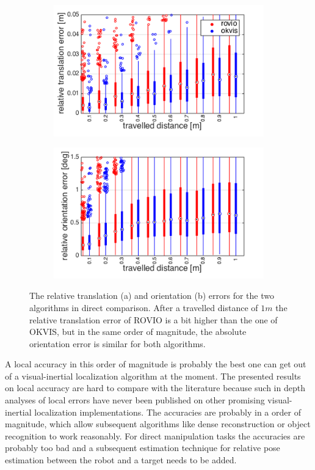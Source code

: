 \begin{figure}[h]
  \begin{subfigure}[b]{0.48\textwidth}
    \includegraphics[width=\textwidth]{images/ijrr/rte.png}
    \caption{}
    \label{fig:2}
  \end{subfigure}
  \hfill
  \begin{subfigure}[b]{0.48\textwidth}
    \includegraphics[width=\textwidth]{images/ijrr/roe.png}
    \caption{}
    \label{fig:2}
  \end{subfigure}
   \caption{The relative translation (a) and orientation (b) errors for the two algorithms in direct comparison. After a travelled distance of $1 m$ the relative translation error of ROVIO is a bit higher than the one of OKVIS, but in the same order of magnitude, the absolute orientation error is similar for both algorithms.}
   \label{pics:ijrr_rel}
\end{figure}

A local accuracy in this order of magnitude is probably the best one can get out of a visual-inertial localization algorithm at the moment. The presented results on local accuracy are hard to compare with the literature because such in depth analyses of local errors have never been published on other promising visual-inertial localization implementations. The accuracies are probably in a order of magnitude, which allow subsequent algorithms like dense reconstruction or object recognition to work reasonably. For direct manipulation tasks the accuracies are probably too bad and a subsequent estimation technique for relative pose estimation between the robot and a target needs to be added.


